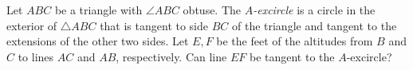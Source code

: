 Let $ABC$ be a triangle with $\angle{ABC}$ obtuse. The \emph{$A$-excircle} is a circle in the exterior of $\triangle{ABC}$ that is tangent to side $BC$ of the triangle and tangent to the extensions of the other two sides. Let $E,F$ be the feet of the altitudes from $B$ and $C$ to lines $AC$ and $AB$, respectively. Can line $EF$ be tangent to the $A$-excircle?